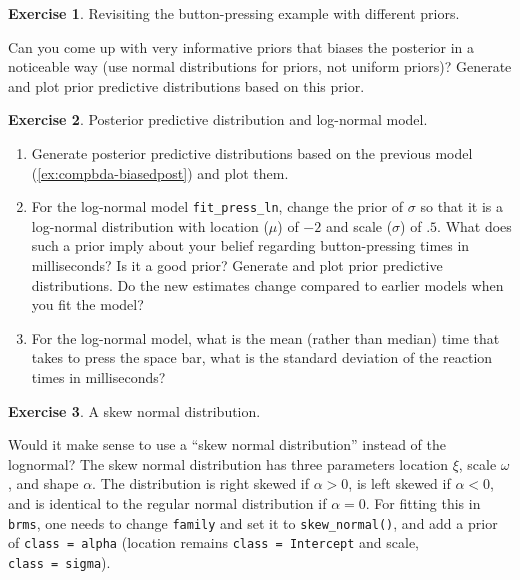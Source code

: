 \documentclass[12pt,]{krantz}
\providecommand{\tightlist}{%
  \setlength{\itemsep}{0pt}\setlength{\parskip}{0pt}}
\theoremstyle{definition}
\theoremstyle{definition}
\theoremstyle{definition}
\newtheorem{exercise}{Exercise}[chapter]
\theoremstyle{remark}
\begin{document}
\begin{exercise}
\protect\hypertarget{exr:compbda-biasedpost}{}{\label{exr:compbda-biasedpost}
}Revisiting the button-pressing example with different priors.
\end{exercise}

\vspace{-.5cm} Can you come up with very informative priors that biases
the posterior in a noticeable way (use normal distributions for priors,
not uniform priors)? Generate and plot prior predictive distributions
based on this prior.

\begin{exercise} \protect\hypertarget{exr:ppd}{}{\label{exr:ppd}
}Posterior predictive distribution and log-normal model.
\end{exercise}

\vspace{-.5cm}

\begin{enumerate}
\def\labelenumi{\alph{enumi}.}
\tightlist
\item
  Generate posterior predictive distributions based on the previous
  model (\ref{ex:compbda-biasedpost}) and plot them.
\item
  For the log-normal model \texttt{fit\_press\_ln}, change the prior of
  \(\sigma\) so that it is a log-normal distribution with location
  (\(\mu\)) of \(-2\) and scale (\(\sigma\)) of \(.5\). What does such a
  prior imply about your belief regarding button-pressing times in
  milliseconds? Is it a good prior? Generate and plot prior predictive
  distributions. Do the new estimates change compared to earlier models
  when you fit the model?
\item
  For the log-normal model, what is the mean (rather than median) time
  that takes to press the space bar, what is the standard deviation of
  the reaction times in milliseconds?
\end{enumerate}

\begin{exercise} \protect\hypertarget{exr:skew}{}{\label{exr:skew}
}A skew normal distribution. \end{exercise}

Would it make sense to use a ``skew normal distribution'' instead of the
lognormal? The skew normal distribution has three parameters location
\(\xi\), scale \(\omega\), and shape \(\alpha\). The distribution is
right skewed if \(\alpha >0\), is left skewed if \(\alpha <0\), and is
identical to the regular normal distribution if \(\alpha =0\). For
fitting this in \texttt{brms}, one needs to change \texttt{family} and
set it to \texttt{skew\_normal()}, and add a prior of
\texttt{class\ =\ alpha} (location remains \texttt{class\ =\ Intercept}
and scale, \texttt{class\ =\ sigma}).
\end{document}
